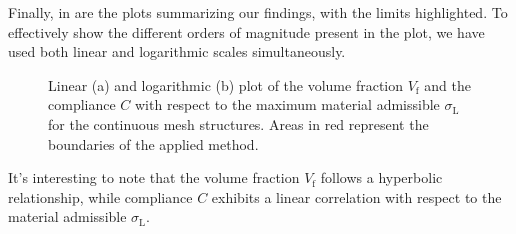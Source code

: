 Finally, in  are the plots summarizing our findings, with the limits highlighted. To effectively show the different orders of magnitude present in the plot, we have used both linear and logarithmic scales simultaneously.
\begin{figure}[]
    \hspace*{\fill}
    \hfill
    \hspace*{\fill}
    \caption{Linear (a) and logarithmic (b) plot of the volume fraction $V_\text{f}$ and the compliance $C$ with respect to the maximum material admissible $\sigma_\text{L}$ for the continuous mesh structures. Areas in red represent the boundaries of the applied method.}
    \label{fig:03_to_plot}
\end{figure}
It's interesting to note that the volume fraction $V_\text{f}$ follows a hyperbolic relationship, while compliance $C$ exhibits a linear correlation with respect to the material admissible $\sigma_\text{L}$.

